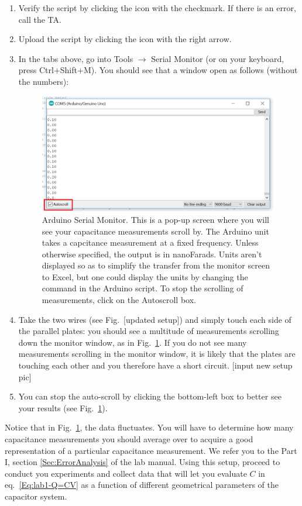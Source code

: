 \documentclass[12pt]{report}
\def\anhkhoi#1{{\color{purple}[#1]}}
\begin{document}
\begin{enumerate}
\item Verify the script by clicking the icon with the checkmark. If there is an error, call the TA.
\item Upload the script by clicking the icon with the right arrow.
\item In the tabs above, go into Tools $\rightarrow$ Serial Monitor (or on your keyboard, press Ctrl+Shift+M). You should see that a window open as follows (without the numbers):
\begin{figure}[h]
\centering
\includegraphics[width=0.85 \textwidth]{lab1-Arduino-monitor.png}
\caption{Arduino Serial Monitor. This is a pop-up screen where you will see your capacitance measurements scroll by. The Arduino unit takes a capcitance measurement at a fixed frequency. Unless otherwise specified, the output is in nanoFarads. Units aren't displayed so as to simplify the transfer from the monitor screen to Excel, but one could display the units by changing the command in the Arduino script. To stop the scrolling of measurements, click on the Autoscroll box.}
\label{Fig:Arduino-Monitor}
\end{figure}

\item Take the two wires (see Fig.~\anhkhoi{updated setup}) and simply touch each side of the parallel plates: you should see a multitude of measurements scrolling down the monitor window, as in Fig.~\ref{Fig:Arduino-Monitor}. If you do not see many measurements scrolling in the monitor window, it is likely that the plates are touching each other and you therefore have a short circuit. \anhkhoi{input new setup pic}
\item You can stop the auto-scroll by clicking the bottom-left box to better see your results (see Fig.~\ref{Fig:Arduino-Monitor}).
\end{enumerate}

Notice that in Fig.~\ref{Fig:Arduino-Monitor}, the data fluctuates. You will have to determine how many capacitance measurements  you should average over to acquire a good representation of a particular capacitance measurement. 
We refer you to the Part I, section \ref{Sec:ErrorAnalysis} of the lab manual. Using this setup, proceed to conduct you experiments and collect data that will let you evaluate $C$ in eq.~\eqref{Eq:lab1-Q=CV} as a function of different geometrical parameters of the capacitor system. 
\end{document}
